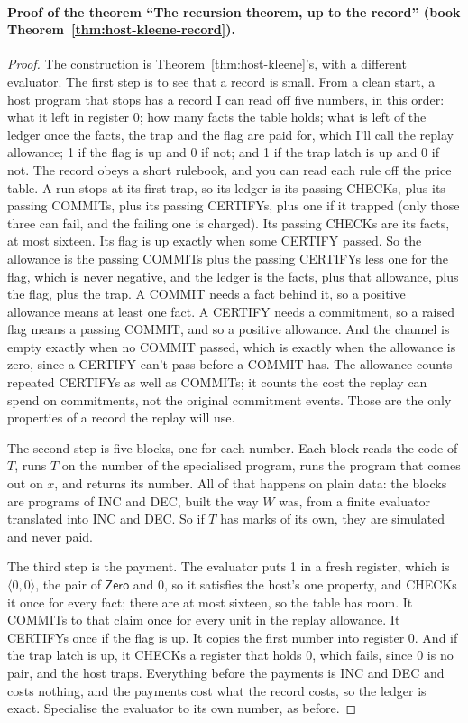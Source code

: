 \documentclass[11pt,twoside]{article}
\theoremstyle{thielethm}
\theoremstyle{thieledef}
\theoremstyle{thieledef}
\theoremstyle{thieledef}
\theoremstyle{thielethm}
\theoremstyle{thieleobs}
\theoremstyle{thielethm}
\begin{document}
\paragraph{Proof of the theorem ``The recursion theorem, up to the record'' (book Theorem~\ref{thm:host-kleene-record}).}
\begin{proof}
The construction is Theorem~\ref{thm:host-kleene}'s, with a different evaluator. The first step is to
see that a record is small. From a clean start, a host program that stops has a record I can read off
five numbers, in this order: what it left in register 0; how many facts the table holds; what is
left of the ledger once the facts, the trap and the flag are paid for, which I'll call the replay allowance;
1 if the flag is up and 0 if not; and 1 if the trap latch is up and 0 if not. The record obeys a
short rulebook, and you can read each rule off the price table. A run stops at its first trap, so
its ledger is its passing CHECKs, plus its passing COMMITs, plus its passing CERTIFYs, plus one if
it trapped (only those three can fail, and the failing one is charged). Its passing CHECKs are its
facts, at most sixteen. Its flag is up exactly when some CERTIFY passed. So the allowance is the
passing COMMITs plus the passing CERTIFYs less one for the flag, which is never negative, and the
ledger is the facts, plus that allowance, plus the flag, plus the trap. A COMMIT needs a fact
behind it, so a positive allowance means at least one fact. A CERTIFY needs a commitment, so a
raised flag means a passing COMMIT, and so a positive allowance. And the channel is empty exactly
when no COMMIT passed, which is exactly when the allowance is zero, since a CERTIFY can't pass
before a COMMIT has. The allowance counts repeated CERTIFYs as well as COMMITs; it counts the cost the
replay can spend on commitments, not the original commitment events. Those are the only properties
of a record the replay will use.

The second step is five blocks, one for each number. Each block reads the code of $T$, runs $T$ on the
number of the specialised program, runs the program that comes out on $x$, and returns its number. All of
that happens on plain data: the blocks are programs of INC and DEC, built the way $W$ was, from a
finite evaluator translated into INC and DEC. So if $T$ has marks
of its own, they are simulated and never paid.

The third step is the payment. The evaluator puts 1 in a fresh register, which is
$\langle 0, 0 \rangle$, the pair of $\mathsf{Zero}$ and 0, so it satisfies the host's one property,
and CHECKs it once for every fact; there are at most sixteen, so the table has room. It COMMITs to that claim once for every unit in the replay allowance. It CERTIFYs
once if the flag is up. It copies the first number into register 0. And if the trap latch is up, it
CHECKs a register that holds 0, which fails, since 0 is no pair, and the host traps. Everything
before the payments is INC and DEC and costs nothing, and the payments cost what the record costs, so the ledger is exact. Specialise the
evaluator to its own number, as before.
\end{proof}
\end{document}
